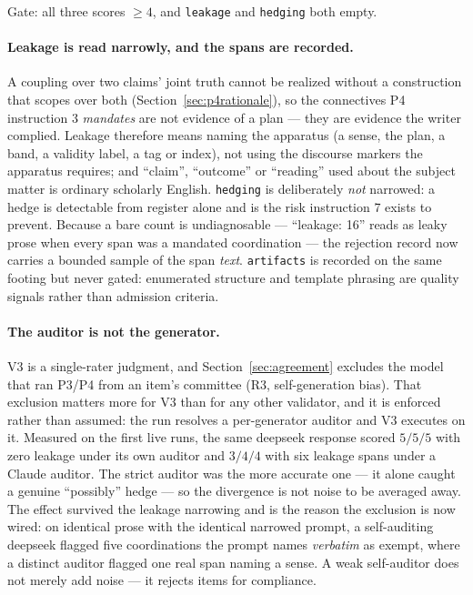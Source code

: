 \documentclass[11pt]{article}
\begin{document}
Gate: all three scores $\geq 4$, and \texttt{leakage} and \texttt{hedging} both empty.

\paragraph{Leakage is read narrowly, and the spans are recorded.} A coupling over two claims'
joint truth cannot be realized without a construction that scopes over both
(Section~\ref{sec:p4rationale}), so the connectives P4 instruction 3 \emph{mandates} are not
evidence of a plan --- they are evidence the writer complied. Leakage therefore means naming the
apparatus (a sense, the plan, a band, a validity label, a tag or index), not using the discourse
markers the apparatus requires; and ``claim'', ``outcome'' or ``reading'' used about the subject
matter is ordinary scholarly English. \texttt{hedging} is deliberately \emph{not} narrowed: a
hedge is detectable from register alone and is the risk instruction 7 exists to prevent. Because
a bare count is undiagnosable --- ``leakage: 16'' reads as leaky prose when every span was a
mandated coordination --- the rejection record now carries a bounded sample of the span
\emph{text}. \texttt{artifacts} is recorded on the same footing but never gated: enumerated
structure and template phrasing are quality signals rather than admission criteria.

\paragraph{The auditor is not the generator.} V3 is a single-rater judgment, and
Section~\ref{sec:agreement} excludes the model that ran P3/P4 from an item's committee (R3,
self-generation bias). That exclusion matters more for V3 than for any other validator, and it is
enforced rather than assumed: the run resolves a per-generator auditor and V3 executes on it.
Measured on the first live runs, the same deepseek response scored $5/5/5$ with zero leakage under
its own auditor and $3/4/4$ with six leakage spans under a Claude auditor. The strict auditor was
the more accurate one --- it alone caught a genuine ``possibly'' hedge --- so the divergence is not
noise to be averaged away. The effect survived the leakage narrowing and is the reason the
exclusion is now wired: on identical prose with the identical narrowed prompt, a self-auditing
deepseek flagged five coordinations the prompt names \emph{verbatim} as exempt, where a distinct
auditor flagged one real span naming a sense. A weak self-auditor does not merely add noise --- it
rejects items for compliance.
\end{document}
